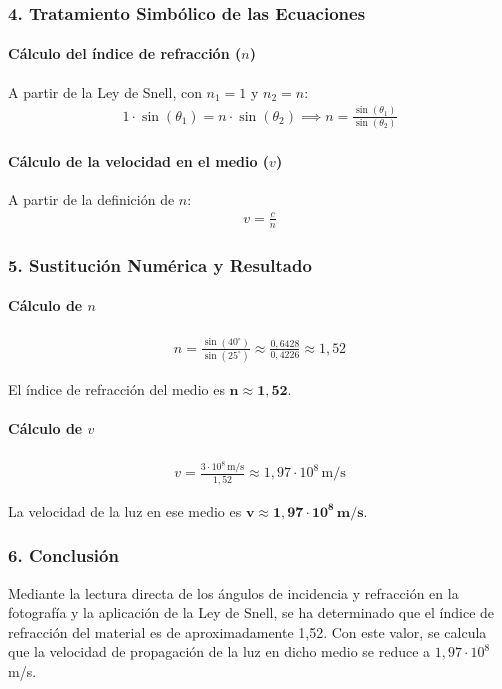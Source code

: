\subsubsection*{4. Tratamiento Simbólico de las Ecuaciones}
\paragraph*{Cálculo del índice de refracción ($n$)}
A partir de la Ley de Snell, con $n_1=1$ y $n_2=n$:
\begin{gather}
    1 \cdot \sin(\theta_1) = n \cdot \sin(\theta_2) \implies n = \frac{\sin(\theta_1)}{\sin(\theta_2)}
\end{gather}
\paragraph*{Cálculo de la velocidad en el medio ($v$)}
A partir de la definición de $n$:
\begin{gather}
    v = \frac{c}{n}
\end{gather}

\subsubsection*{5. Sustitución Numérica y Resultado}
\paragraph*{Cálculo de $n$}
\begin{gather}
    n = \frac{\sin(40^\circ)}{\sin(25^\circ)} \approx \frac{0,6428}{0,4226} \approx 1,52
\end{gather}
\begin{cajaresultado}
El índice de refracción del medio es $\boldsymbol{n \approx 1,52}$.
\end{cajaresultado}
\paragraph*{Cálculo de $v$}
\begin{gather}
    v = \frac{3 \cdot 10^8 \, \text{m/s}}{1,52} \approx 1,97 \cdot 10^8 \, \text{m/s}
\end{gather}
\begin{cajaresultado}
La velocidad de la luz en ese medio es $\boldsymbol{v \approx 1,97 \cdot 10^8 \, \textbf{m/s}}$.
\end{cajaresultado}

\subsubsection*{6. Conclusión}
\begin{cajaconclusion}
Mediante la lectura directa de los ángulos de incidencia y refracción en la fotografía y la aplicación de la Ley de Snell, se ha determinado que el índice de refracción del material es de aproximadamente 1,52. Con este valor, se calcula que la velocidad de propagación de la luz en dicho medio se reduce a $1,97 \cdot 10^8$ m/s.
\end{cajaconclusion}

